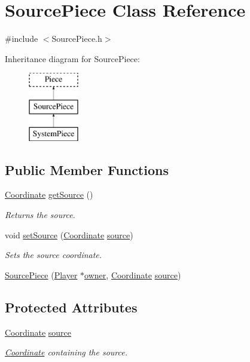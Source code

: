 \hypertarget{classSourcePiece}{\section{Source\-Piece Class Reference}
\label{classSourcePiece}
}


{\ttfamily \#include $<$Source\-Piece.\-h$>$}

Inheritance diagram for Source\-Piece\-:\begin{figure}[H]
\begin{center}
\leavevmode
\includegraphics[height=3.000000cm]{classSourcePiece}
\end{center}
\end{figure}
\subsection*{Public Member Functions}
\begin{DoxyCompactItemize}
\item 
\hyperlink{structCoordinate}{Coordinate} \hyperlink{classSourcePiece_a15e950d71f3d178d0d585246deedc6b8}{get\-Source} ()
\begin{DoxyCompactList}\small\item\em Returns the source. \end{DoxyCompactList}\item 
void \hyperlink{classSourcePiece_a8f9733cc1e7f75aad92c12d84d8710e2}{set\-Source} (\hyperlink{structCoordinate}{Coordinate} \hyperlink{classSourcePiece_a9c04073192af496ceaf536dfb334a718}{source})
\begin{DoxyCompactList}\small\item\em Sets the source coordinate. \end{DoxyCompactList}\item 
\hyperlink{classSourcePiece_abdff14565936734507eac75bb4f929ea}{Source\-Piece} (\hyperlink{classPlayer}{Player} $\ast$\hyperlink{classPiece_a43beac3b5268343b9f7e575d637eda98}{owner}, \hyperlink{structCoordinate}{Coordinate} \hyperlink{classSourcePiece_a9c04073192af496ceaf536dfb334a718}{source})
\end{DoxyCompactItemize}
\subsection*{Protected Attributes}
\begin{DoxyCompactItemize}
\item 
\hyperlink{structCoordinate}{Coordinate} \hyperlink{classSourcePiece_a9c04073192af496ceaf536dfb334a718}{source}
\begin{DoxyCompactList}\small\item\em \hyperlink{structCoordinate}{Coordinate} containing the source. \end{DoxyCompactList}\end{DoxyCompactItemize}
